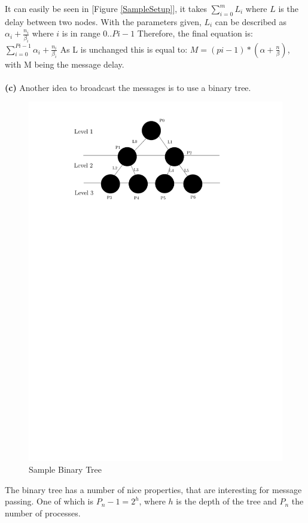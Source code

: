 \documentclass[a4paper,twoside,11pt]{article}
\begin{document}
It can easily be seen in [Figure \ref{SampleSetup}], it takes $\sum\limits_{i=0}^m L_i$ where $L$ is the delay between two nodes.
With the parameters given, $L_i$ can be described as $\alpha_i + \frac{n_i}{\beta_i}$ where $i$ is in range $0 .. Pi-1$
Therefore, the final equation is: $\sum\limits_{i=0}^{Pi-1} \alpha_i + \frac{n_i}{\beta_i}$
As L is unchanged this is equal to: $M = (pi-1) * (\alpha + \frac{n}{\beta})$, with M being the message delay.
\\\\
\textbf{(c)}\hspace{1em} Another idea to broadcast the messages is to use a binary tree.
\begin{figure}[!htbp]
    \begin{center}
        \includegraphics[scale=1]{3c_1.pdf}
    \end{center}
    \caption{Sample Binary Tree}
    \label{BinTree}
\end{figure}
The binary tree has a number of nice properties, that are interesting for message passing.
One of which is $P_n-1=2^h$, where  $h$ is the depth of the tree and $P_n$ the number of processes.
\end{document}

